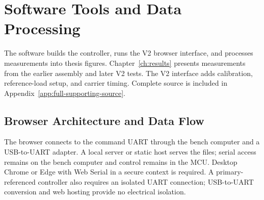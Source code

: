 \chapter{Software Tools and Data Processing}
\label{app:software-tools}

The software builds the controller, runs the V2 browser interface, and processes measurements into thesis figures. Chapter~\ref{ch:results} presents measurements from the earlier assembly and later V2 tests. The V2 interface adds calibration, reference-load setup, and carrier timing. Complete source is included in Appendix~\ref{app:full-supporting-source}.

\section{Browser Architecture and Data Flow}
\label{sec:app-browser-architecture}

The browser connects to the command UART through the bench computer and a
USB-to-UART adapter. A local server or static host serves the files; serial
access remains on the bench computer and control remains in the MCU. Desktop
Chrome or Edge with Web Serial in a secure context is required. A
primary-referenced controller also requires an isolated UART connection;
USB-to-UART conversion and web hosting provide no electrical isolation.

